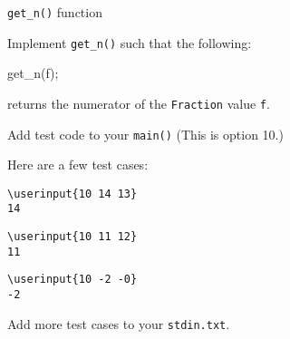 \verb!get_n()! function

Implement \verb!get_n()! such that the following:
\begin{console}
get_n(f);
\end{console}
returns the numerator of the \verb!Fraction! value \verb!f!.

Add test code to your \verb!main()!
(This is option 10.)


Here are a few test cases:

\resett
\nextt
\begin{Verbatim}[frame=single, commandchars=\\\{\}]
\userinput{10 14 13}
14
\end{Verbatim}

\nextt
\begin{Verbatim}[frame=single, commandchars=\\\{\}]
\userinput{10 11 12}
11
\end{Verbatim}

\nextt
\begin{Verbatim}[frame=single, commandchars=\\\{\}]
\userinput{10 -2 -0}
-2
\end{Verbatim}

Add more test cases to your \verb!stdin.txt!.
